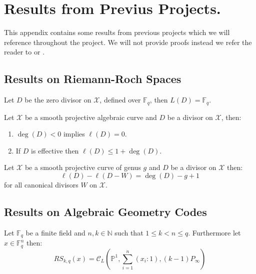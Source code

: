 \chapter{Results from Previus Projects.}
This appendix contains some results from previous projects which we will reference throughout the project.
We will not provide proofs instead we refer the reader to \cite{bachellor} or \cite{Fulton}.

\section*{Results on Riemann-Roch Spaces}
\begin{lemma}\label{lem:2.87}
Let $D$ be the zero divisor on $\mathcal{X}$, defined over $\mathbb{F}_q$, then $L(D) = \mathbb{F}_{q}$.
\end{lemma}
\begin{proposition}\label{prop:2.88}
  Let $\mathcal{X}$ be a smooth projective algebraic curve and $D$ be a divisor on $\mathcal{X}$, then:
  \begin{enumerate}
    \item $\deg(D) < 0$ implies $\ell(D) = 0$. \label{prop:2.88i}
    \item If $D$ is effective then $\ell(D) \leq 1 + \deg(D)$. \label{prop:2.88ii}
  \end{enumerate}
\end{proposition}

\begin{theorem}\label{thm:RR}
  Let $\mathcal{X}$ be a smooth projective curve of genus $g$ and $D$ be a divisor on $\mathcal{X}$ then:
  \begin{equation*}
    \ell(D) - \ell(D - W) = \deg(D) - g + 1
  \end{equation*}
  for all canonical divisors $W$ on $\mathcal{X}$.
\end{theorem}

\section*{Results on Algebraic Geometry Codes}

\begin{theorem}\label{thm:RS_is_AG}
  Let $\mathbb{F}_q$ be a finite field and $n, k \in \mathbb{N}$ such that $1 \leq k < n \leq q$. Furthermore let $x \in \mathbb{F}_q^n$ then:
  \begin{equation*}
    RS_{k, q}(x) = \mathcal{C}_L\left(\mathbb{P}^1, \sum^n_{i = 1} (x_i : 1), (k - 1)P_{\infty}\right)
  \end{equation*}
\end{theorem}
